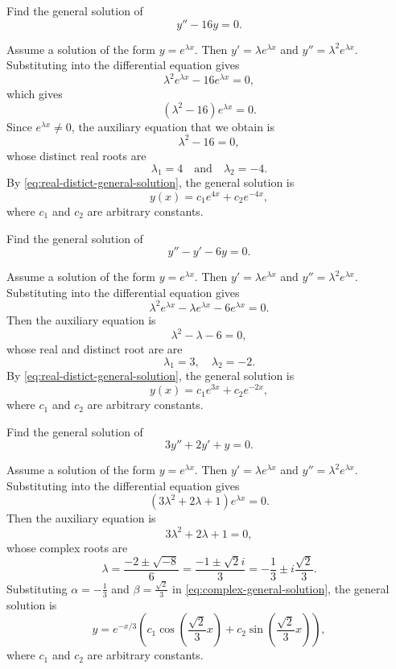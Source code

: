 \begin{example}\label{eg:distict-real-1}
	Find the general solution of $$y''-16y = 0.$$ 
\end{example}
\begin{solution}
		 Assume a solution of the form $y = e^{\lambda x}$. Then $y' = \lambda e^{\lambda x}$ and $y'' = \lambda^2 e^{\lambda x}$. Substituting into the differential equation gives
		\[
		\lambda^2 e^{\lambda x} - 16 e^{\lambda x} = 0,\] which gives \[(\lambda^2 - 16) e^{\lambda x} = 0.
		\]
		Since $e^{\lambda x} \neq 0$, the auxiliary equation that we obtain is
		\[
		\lambda^2 - 16 = 0,
		\]
		whose distinct real roots are \[\lambda_1 = 4\quad\mbox{and}\quad \lambda_2 =-4.\]
		By \eqref{eq:real-distict-general-solution}, the general solution is
		\[
		y(x) = c_1 e^{4x} + c_2 e^{-4x},
		\]
		where $c_1$ and $c_2$ are arbitrary constants.
	\end{solution}
 
 \begin{example}\label{eg:distict-real-2}
 	Find the general solution of  $$y''-y'-6y = 0.$$
 \end{example}
 \begin{solution}
 		Assume a solution of the form $y = e^{\lambda x}$. Then $y' = \lambda e^{\lambda x}$ and $y'' = \lambda^2 e^{\lambda x}$. Substituting into the differential equation gives
 		\[
 		\lambda^2 e^{\lambda x} - \lambda e^{\lambda x} - 6 e^{\lambda x} = 0.
 		\]
 		Then the auxiliary equation is
 		\[
 		\lambda^2 - \lambda - 6 = 0,
 		\]
 		whose real and distinct root are
 		 are
 		\[
 		\lambda_1 = 3, \quad \lambda_2 = -2.
 		\]
 		By \eqref{eq:real-distict-general-solution}, the general solution is
 		\[
 		y(x) = c_1 e^{3x} + c_2 e^{-2x},
 		\]
 		where \(c_1\) and \(c_2\) are arbitrary constants.
 	\end{solution}
 \begin{example}\label{eg:complex}
 	Find the general solution of  $$3y''+2y'+y = 0.$$
 	\end{example}
 	\begin{solution}
 		Assume a solution of the form $y = e^{\lambda x}$. Then $y' = \lambda e^{\lambda x}$ and $y'' = \lambda^2 e^{\lambda x}$. Substituting into the differential equation gives
 		\[
 		(3\lambda^2 + 2\lambda + 1)e^{\lambda x} = 0.
 		\]
 		Then the auxiliary equation is
 		\[3\lambda^2 + 2\lambda + 1=0,\]
 		whose complex roots are
 		\[
 		\lambda = \frac{-2 \pm \sqrt{-8}}{6} = \frac{-1 \pm \sqrt{2} i}{3} = -\frac{1}{3} \pm i \frac{\sqrt{2}}{3}.
 		\]
 		Substituting \(\alpha = -\frac{1}{3}\) and \(\beta = \frac{\sqrt{2}}{3}\)  in \ref{eq:complex-general-solution}, the general solution is 
 		\[
 	y = e^{-x/3} \left( c_1 \cos \left(\frac{\sqrt{2}}{3} x\right) + c_2 \sin \left(\frac{\sqrt{2}}{3} x\right) \right),
 		\]	where \(c_1\) and \(c_2\) are arbitrary constants.
 	\end{solution}
 	

